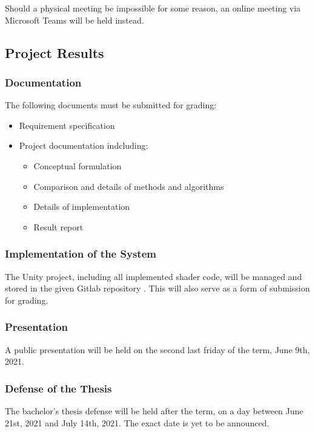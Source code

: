 \vspace{\baselineskip}
\noindent Should a physical meeting be impossible for some reason, an online meeting via Microsoft Teams will be held instead.


\subsection{Project Results}

\subsubsection{Documentation}
The following documents must be submitted for grading:
\begin{itemize}
    \item Requirement specification
    \item Project documentation indcluding:
    \begin{itemize}
        \item Conceptual formulation
        \item Comparison and details of methods and algorithms
        \item Details of implementation
        \item Result report
    \end{itemize}
\end{itemize}

\subsubsection{Implementation of the System}
The Unity project, including all implemented shader code, will be managed and stored in the given Gitlab repository \cite{gitlab}. This will also serve as a form of submission for grading.

\subsubsection{Presentation}
A public presentation will be held on the second last friday of the term, June 9th, 2021.

\subsubsection{Defense of the Thesis}
The bachelor's thesis defense will be held after the term, on a day between June 21st, 2021 and July 14th, 2021. The exact date is yet to be announced. 

